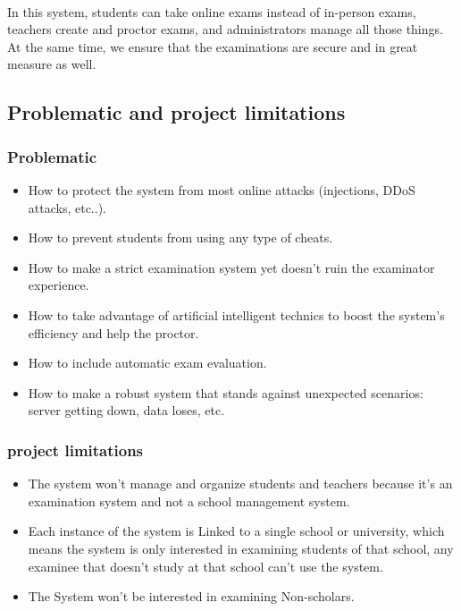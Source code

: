 \documentclass[]{uc2pfecaneva}
\begin{document}
    \paragraph{}
    In this system, students can take online exams instead of in-person exams, teachers create and proctor exams, and administrators manage all those things. At the same time, we ensure that the examinations are secure and in great measure as well.

    \subsection{Problematic and project limitations}
    \subsubsection{Problematic}

    \begin{itemize}
        \item How to protect the system from most online attacks (injections, DDoS attacks, etc..).
        \item How to prevent students from using any type of cheats.
        \item How to make a strict examination system yet doesn't ruin the examinator experience.
        \item How to take advantage of artificial intelligent technics to boost the system’s efficiency and help the proctor.
        \item How to include automatic exam evaluation.
        \item How to make a robust system that stands against unexpected scenarios: server getting down, data loses, etc.
    \end{itemize}


    \subsubsection{project limitations}

    \begin{itemize}
        \item The system won't manage and organize students and teachers because it's an examination system and not a school management system.
        \item Each instance of the system is Linked to a single school or university, which means the system is only interested in examining students of that school, any examinee that doesn't study at that school can’t use the system.
        \item The System won't be interested in examining Non-scholars.
    \end{itemize}
\end{document}
